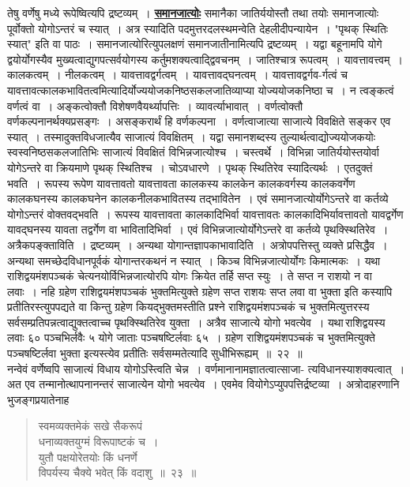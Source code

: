 \documentclass[11pt, openany]{book}
\begin{document}
तेषु वर्णेषु मध्ये रूपेष्वित्यपि द्रष्टव्यम्~। \hyperref[22]{\textbf{समानजात्योः}} समानैका
जातिर्ययोस्तौ
\thispagestyle{empty}
\afterpage{\fancyhead[LE,RO]{\thepage}}
\cfoot{}
\newpage %
\noindent तथा तयोः समानजात्योः पूर्वोक्तो योगोऽन्तरं च स्यात्~। अत्र स्यादिति
पदमुत्तरदलस्थमन्वेति देहलीदीपन्यायेन~। "पृथक् स्थितिः स्यात्" इति वा पाठः~।
समानजात्योरित्युपलक्षणं समानजातीनामित्यपि द्रष्टव्यम्~। यद्वा बहूनामपि योगे
द्वयोर्योगस्यैव मुख्यत्वाद्युगपत्सर्वयोगस्य कर्तुमशक्यत्वाद्द्विवचनम्~। जातिश्चात्र
रूपत्वम्~। यावत्तावत्त्वम्~। कालकत्वम्~। नीलकत्वम्~। यावत्तावद्वर्गत्वम्~। यावत्तावद्घनत्वम्~। यावत्तावद्वर्गव-र्गत्वं च यावत्तावत्कालकभावितत्वमित्यादिर्योज्ययोजकनिष्ठसकलजातिव्याप्या
योज्ययोजकनिष्ठा च~। न त्वङ्कत्वं वर्णत्वं वा~। अङ्कत्वोक्तौ विशेषणवैयर्थ्यापत्तिः~।
व्यावर्त्याभावात्~। वर्णत्वोक्तौ वर्णकल्पनानर्थक्यप्रसङ्गः~। असङ्करार्थं हि वर्णकल्पना~।
वर्णत्वाजात्या साजात्ये विवक्षिते सङ्कर एव स्यात्~। तस्मादुक्तविधजात्यैव साजात्यं
विवक्षितम्~। यद्वा समानशब्दस्य तुल्यार्थत्वाद्योज्ययोजकयोः स्वस्वनिष्ठसकलजातिभिः
साजात्यं विवक्षितं विभिन्नजात्योश्च~। चस्त्वर्थे~। विभिन्ना जातिर्ययोस्तयोर्वा
योगेऽन्तरे वा क्रियमाणे पृथक् स्थितिश्च~। चोऽवधारणे~। पृथक् स्थितिरेव स्यादित्यर्थः~।
एतदुक्तं भवति~। रूपस्य रूपेण यावत्तावतो यावत्तावता कालकस्य कालकेन कालकवर्गस्य
कालकवर्गेण कालकघनस्य कालकघनेन कालकनीलकभावितस्य तद्भावितेन~। एवं
समानजात्योर्योगेऽन्तरे वा कर्तव्ये योगोऽन्तरं वोक्तवद्भवति~। रूपस्य
यावत्तावता कालकादिभिर्वा यावत्तावतः कालकादिभिर्यावत्तावतो यावद्वर्गेण यावद्घनस्य
यावता तद्वर्गेण वा भावितादिभिर्वा~। एवं विभिन्नजात्योर्योगेऽन्तरे वा कर्तव्ये
पृथक्स्थितिरेव~। अत्रैकपङ्क्ताविति~। द्रष्टव्यम्~। अन्यथा
योगान्तज्ञापकाभावादिति~।
अत्रोपपत्तिस्तु व्यक्ते प्रसिद्धैव~। अन्यथा समच्छेदविधानपूर्वकं
योगान्तरकथनं न स्यात्~। किञ्च विभिन्नजात्योर्योगः किमात्मकः~। यथा राशिद्वयमंशपञ्चकं
चेत्यनयोर्विभिन्नजात्योरपि योगः क्रियेत तर्हि सप्त स्युः~। ते सप्त न राशयो न वा
लवाः~। नहि ग्रहेण राशिद्वयमंशपञ्चकं भुक्तमित्युक्ते ग्रहेण सप्त राशयः सप्त लवा
वा भुक्ता इति कस्यापि प्रतीतिरस्त्युपपद्यते वा किन्तु ग्रहेण
कियद्भुक्तमस्तीति प्रश्ने राशिद्वयमंशपञ्चकं च भुक्तमित्युत्तरस्य सर्वसम्प्रतिपन्नत्वाद्युक्तत्वाच्च
पृथक्स्थितिरेव युक्ता~।
अत्रैव साजात्ये योगो भवत्येव~। यथा\textendash \,राशिद्वयस्य लवाः ६० पञ्चभिर्लवैः ५ योगे जाताः पञ्चषष्टिर्लवाः ६५~। ग्रहेण राशिद्वयमंशपञ्चकं च भुक्तमित्युक्ते
पञ्चषष्टिर्लवा भुक्ता इत्यस्त्येव प्रतीतिः सर्वसम्मतेत्यादि सुधीभिरूह्यम्~॥~२२~॥\\

\vspace{-3mm}
नन्वेवं वर्णेष्वपि साजात्यं विधाय योगोऽस्त्विति चेन्न~।
वर्णमानानामज्ञातत्वात्साजा-
\newpage
\noindent त्यविधानस्याशक्यत्वात्~। अत एव तन्मानोत्थापनानन्तरं साजात्येन योगो भवत्येव~। एवमेव वियोगेऽप्युपपत्तिर्द्रष्टव्या~। अत्रोदाहरणानि
भुजङ्गप्रयातेनाह\textendash \,
\begin{quote}
    {\eg
    स्वमव्यक्तमेकं सखे सैकरूपं \\
    धनाव्यक्तयुग्मं विरूपाष्टकं च~। \\
युतौ पक्षयोरेतयोः किं धनर्णे \\
विपर्यस्य चैक्ये भवेत् किं वदाशु~॥~२३~॥}
\end{quote}
\end{document}
